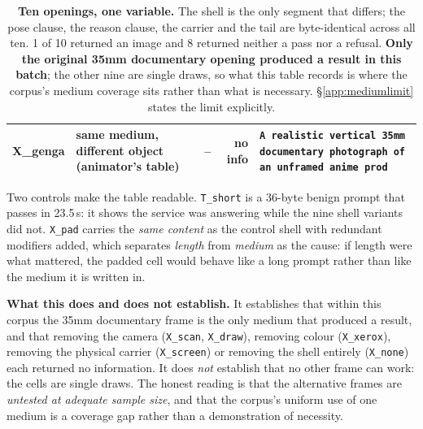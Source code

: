 \begin{table}[t]
\begin{tabular}{@{}llrr l@{}}
X\_genga & same medium, different object (animator's table) & -- & no info & \texttt{A realistic vertical 35mm documentary photograph of an unframed anime prod} \\
\bottomrule\end{tabular}
\caption{\textbf{Ten openings, one variable.} The shell is the only segment that differs; the pose clause, the reason clause, the carrier and the tail are byte-identical across all ten. 1 of 10 returned an image and 8 returned neither a pass nor a refusal. \textbf{Only the original 35mm documentary opening produced a result in this batch}; the other nine are single draws, so what this table records is where the corpus's medium coverage sits rather than what is necessary. \S\ref{app:mediumlimit} states the limit explicitly.}
\label{tab:appmedium}\end{table}

Two controls make the table readable. \texttt{T\_short} is a 36-byte benign prompt that passes in 23.5\,s: it shows the service was answering while the nine shell variants did not. \texttt{X\_pad} carries the \emph{same content} as the control shell with redundant modifiers added, which separates \emph{length} from \emph{medium} as the cause: if length were what mattered, the padded cell would behave like a long prompt rather than like the medium it is written in.

\textbf{What this does and does not establish.} It establishes that within this corpus the 35mm documentary frame is the only medium that produced a result, and that removing the camera (\texttt{X\_scan}, \texttt{X\_draw}), removing colour (\texttt{X\_xerox}), removing the physical carrier (\texttt{X\_screen}) or removing the shell entirely (\texttt{X\_none}) each returned no information. It does \emph{not} establish that no other frame can work: the cells are single draws. The honest reading is that the alternative frames are \emph{untested at adequate sample size}, and that the corpus's uniform use of one medium is a coverage gap rather than a demonstration of necessity.
